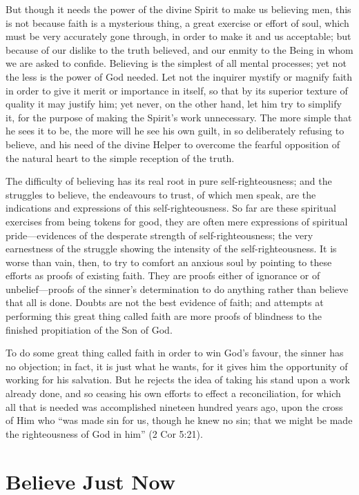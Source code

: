 \documentclass[
]{book}
\begin{document}
But though it needs the power of the divine Spirit to make us believing men, this is not because faith is a mysterious thing, a great exercise or effort of soul, which must be very accurately gone through, in order to make it and us acceptable; but because of our dislike to the truth believed, and our enmity to the Being in whom we are asked to confide. Believing is the simplest of all mental processes; yet not the less is the power of God needed. Let not the inquirer mystify or magnify faith in order to give it merit or importance in itself, so that by its superior texture of quality it may justify him; yet never, on the other hand, let him try to simplify it, for the purpose of making the Spirit's work unnecessary. The more simple that he sees it to be, the more will he see his own guilt, in so deliberately refusing to believe, and his need of the divine Helper to overcome the fearful opposition of the natural heart to the simple reception of the truth.

The difficulty of believing has its real root in pure self-righteousness; and the struggles to believe, the endeavours to trust, of which men speak, are the indications and expressions of this self-righteousness. So far are these spiritual exercises from being tokens for good, they are often mere expressions of spiritual pride---evidences of the desperate strength of self-righteousness; the very earnestness of the struggle showing the intensity of the self-righteousness. It is worse than vain, then, to try to comfort an anxious soul by pointing to these efforts as proofs of existing faith. They are proofs either of ignorance or of unbelief---proofs of the sinner's determination to do anything rather than believe that all is done. Doubts are not the best evidence of faith; and attempts at performing this great thing called faith are more proofs of blindness to the finished propitiation of the Son of God.

To do some great thing called faith in order to win God's favour, the sinner has no objection; in fact, it is just what he wants, for it gives him the opportunity of working for his salvation. But he rejects the idea of taking his stand upon a work already done, and so ceasing his own efforts to effect a reconciliation, for which all that is needed was accomplished nineteen hundred years ago, upon the cross of Him who ``was made sin for us, though he knew no sin; that we might be made the righteousness of God in him'' (2 Cor 5:21).

\hypertarget{believe-just-now}{%
\chapter{Believe Just Now}\label{believe-just-now}}
\end{document}
